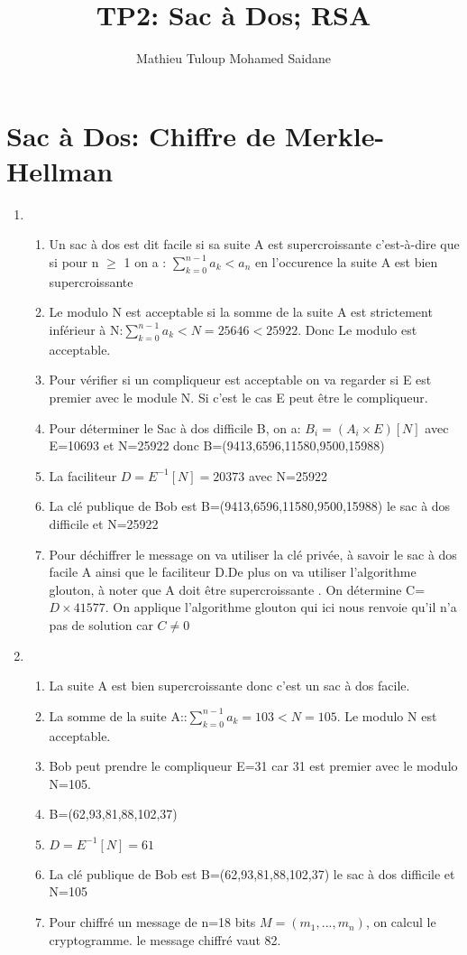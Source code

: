 \documentclass[titlepage]{article}
\title{TP2: Sac à Dos; RSA}
\author{Mathieu Tuloup Mohamed Saidane}
\date{}
\begin{document}
\maketitle

\section{Sac à Dos: Chiffre de Merkle-Hellman}
\begin{enumerate}
    \item \begin{enumerate}
    \item Un sac à dos est dit facile si sa suite A est supercroissante c'est-à-dire que si pour n $\geq$ 1 on a : 
        $\sum_{k=0}^{n-1} a_k<a_n   $ en l'occurence la suite A est bien supercroissante
    
    \item Le modulo N est acceptable si la somme de la suite A est strictement inférieur à N:$\sum_{k=0}^{n-1} a_k < N=25646<25922$. Donc Le modulo est acceptable.
    \item Pour vérifier si un compliqueur est acceptable on va regarder si E est premier avec le module N. Si c'est le cas E peut être le compliqueur.
    \item Pour déterminer le Sac à dos difficile B, on a: $B_i=(A_i \times E)[N] $ avec E=10693 et N=25922 donc B=(9413,6596,11580,9500,15988)
    \item La faciliteur $D=E^{-1}[N]=20373 $ avec N=25922  
    \item La clé publique de Bob est B=(9413,6596,11580,9500,15988) le sac à dos difficile et N=25922
    \item Pour déchiffrer le message on va utiliser la clé privée, à savoir le sac à dos facile A ainsi que le faciliteur D.De plus on va utiliser l'algorithme glouton, à noter que A doit être supercroissante . On détermine C=$D\times 41577$. On applique l'algorithme glouton qui ici nous renvoie qu'il n'a pas de solution car $C\ne 0$
\end{enumerate}
 \item \begin{enumerate}
\item La suite A est bien supercroissante donc c'est un sac à dos facile.
 \item La somme de la suite A::$\sum_{k=0}^{n-1} a_k=103<N=105$. Le modulo N est acceptable.
 \item Bob peut prendre le compliqueur E=31 car 31 est premier avec le modulo N=105.
 \item B=(62,93,81,88,102,37)
\item $D=E^{-1}[N]=61$
\item La clé publique de Bob est B=(62,93,81,88,102,37) le sac à dos difficile et N=105
\item Pour chiffré un message de n=18 bits $M=(m_1,...,m_n)$, on calcul le cryptogramme. le message chiffré vaut 82.
 \end{enumerate} 

    
    
\end{enumerate}
\end{document}
